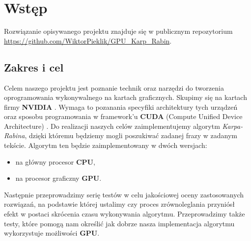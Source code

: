 \section{Wstęp}
Rozwiązanie opisywanego projektu znajduje się w publicznym repozytorium \url{https://github.com/WiktorPieklik/GPU_Karp_Rabin}.
\subsection{Zakres i cel}
Celem naszego projektu jest poznanie technik oraz narzędzi do tworzenia oprogramowania wykonywalnego na kartach graficznych. Skupimy się na kartach firmy \textbf{NVIDIA} \cite{nvidia}. Wymaga to pozanania specyfiki architektury tych urządzeń oraz sposobu programowania w framework'u \textbf{CUDA} (Compute Unified Device Architecture) \cite{cuda}. Do realizacji naszych celów zaimplementujemy algorytm \textit{Karpa-Rabina}, dzięki któremu będziemy mogli poszukiwać zadanej frazy w zadanym tekście. Algorytm ten będzie zaimplementowany w dwóch wersjach:
\begin{itemize}
    \item na główny procesor \textbf{CPU},
    \item na procesor graficzny \textbf{GPU}.
\end{itemize}
Następnie przeprowadzimy serię testów w celu jakościowej oceny zastosowanych rozwiązań, na podstawie której ustalimy czy proces zrównoleglania przyniósł efekt w postaci skrócenia czasu wykonywania algorytmu. Przeprowadzimy także testy, które pomogą nam określić jak dobrze nasza implementacja algorytmu wykorzystuje możliwości \textbf{GPU}.